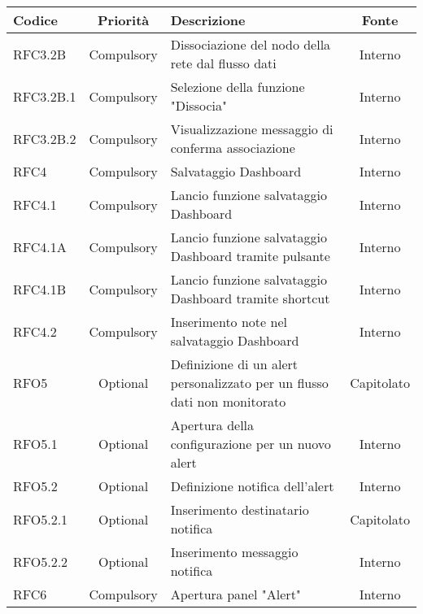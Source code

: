 		
        \begin{table}[!htpb]
            \centering
            \renewcommand{\arraystretch}{1.5} %
            \begin{tabular}{|l|c|p{8cm}|c|}
                \rowcolor{orange!50}
        		\hline
        		\textbf{Codice} & \textbf{Priorità} & \textbf{Descrizione} & \textbf{Fonte}\\
                \hline
                RFC3.2B & Compulsory & Dissociazione del nodo della rete dal flusso dati & Interno\\
                \hline
                RFC3.2B.1 & Compulsory & Selezione della funzione "Dissocia" & Interno\\
                \hline
                RFC3.2B.2 & Compulsory & Visualizzazione messaggio di conferma associazione & Interno\\
                \hline
                RFC4 & Compulsory & Salvataggio Dashboard & Interno\\
                \hline
                RFC4.1 & Compulsory & Lancio funzione salvataggio Dashboard & Interno\\
                \hline
                RFC4.1A & Compulsory & Lancio funzione salvataggio Dashboard tramite pulsante & Interno\\
                \hline
                RFC4.1B & Compulsory & Lancio funzione salvataggio Dashboard tramite shortcut & Interno\\
                \hline
                RFC4.2 & Compulsory & Inserimento note nel salvataggio Dashboard & Interno\\
                \hline
                RFO5 & Optional & Definizione di un alert personalizzato per un flusso dati non monitorato & Capitolato\\
                \hline
                RFO5.1 & Optional & Apertura della configurazione per un nuovo alert & Interno\\
                \hline
                RFO5.2 & Optional & Definizione notifica dell'alert & Interno\\
                \hline
                RFO5.2.1 & Optional & Inserimento destinatario notifica & Capitolato\\
                \hline
                RFO5.2.2 & Optional & Inserimento messaggio notifica & Interno\\
                \hline
                RFC6 & Compulsory & Apertura panel "Alert" & Interno\\

\end{tabular}
\end{table}
